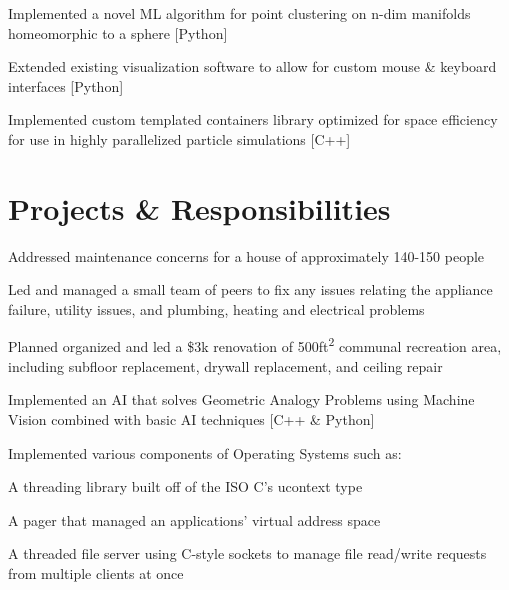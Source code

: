 \documentclass[letterpaper]{headers} %
\begin{document}
\begin{minipage}[t]{0.66\textwidth}
	\sectionspace
	
	\begin{tightitemize}
		\item Implemented a novel ML algorithm for point clustering on n-dim manifolds homeomorphic to a sphere [Python]
		\item Extended existing visualization software to allow for custom mouse \& keyboard interfaces [Python]
		\item Implemented custom templated containers library optimized for space efficiency for use in highly parallelized particle simulations [C++]
	\end{tightitemize}


\sectionspace

\section{Projects \& Responsibilities}
	\begin{tightitemize}
		\item Addressed maintenance concerns for a house of approximately 140-150 people
		\item Led and managed a small team of peers to fix any issues relating the appliance failure, utility issues, and plumbing, heating and electrical problems
		\item Planned organized and led a \$3k renovation of 500ft\textsuperscript{2} communal recreation area, including subfloor replacement, drywall replacement, and ceiling repair
	\end{tightitemize}
	
	\sectionspace
	
	\begin{tightitemize}
		\item Implemented an AI that solves Geometric Analogy Problems using Machine Vision combined with basic AI techniques [C++ \& Python]
		\item Implemented various components of Operating Systems such as:\\
		\begin{tightitemize}
			\item A threading library built off of the ISO C's ucontext type
			\item A pager that managed an applications' virtual address space
			\item A threaded file server using C-style sockets to manage file read/write requests from multiple clients at once
		\end{tightitemize}
	\end{tightitemize}

\end{minipage}
\end{document}
